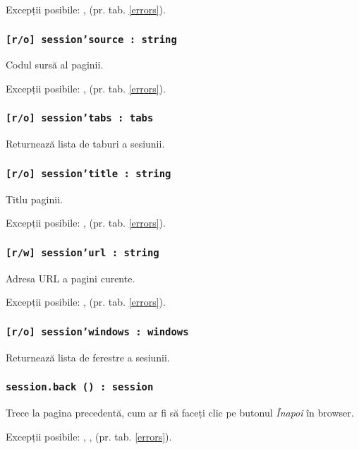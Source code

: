 Excepții posibile: ,  (pr. tab. \ref{errors}).

\subsubsection{\texttt{[r/o] session'source : string}}

Codul sursă al paginii.

Excepții posibile: ,  (pr. tab. \ref{errors}).

\subsubsection{\texttt{[r/o] session'tabs : tabs}}

Returnează lista de taburi a sesiunii.

\subsubsection{\texttt{[r/o] session'title : string}}

Titlu paginii.

Excepții posibile: ,  (pr. tab. \ref{errors}).

\subsubsection{\texttt{[r/w] session'url : string}}

Adresa URL a pagini curente.

Excepții posibile: ,  (pr. tab. \ref{errors}).

\subsubsection{\texttt{[r/o] session'windows : windows}}

Returnează lista de ferestre a sesiunii.

\subsubsection{\texttt{session.back () : session}}

Trece la pagina precedentă, cum ar fi să faceți clic pe butonul \textit{Înapoi} în browser.

Excepții posibile: , ,  (pr. tab. \ref{errors}).

